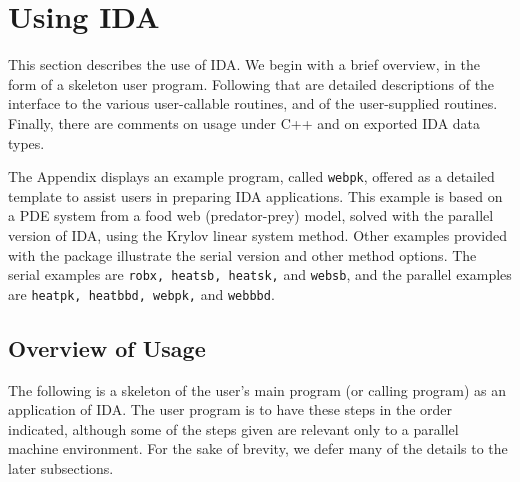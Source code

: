 \documentclass[11pt]{article}
\begin{document}
\section{Using IDA}

This section describes the use of IDA.  We begin with a brief
overview, in the form of a skeleton user program.  Following that are
detailed descriptions of the interface to the various user-callable
routines, and of the user-supplied routines.  Finally, there are
comments on usage under C++ and on exported IDA data types.

The Appendix displays an example program, called {\tt webpk}, offered
as a detailed template to assist users in preparing IDA applications.
This example is based on a PDE system from a food web (predator-prey)
model, solved with the parallel version of IDA, using the Krylov
linear system method.  Other examples provided with the package
illustrate the serial version and other method options.  The serial
examples are {\tt robx, heatsb, heatsk,} and {\tt websb}, and the
parallel examples are {\tt heatpk, heatbbd, webpk,} and {\tt webbbd}.


\subsection{Overview of Usage}

The following is a skeleton of the user's main program (or
calling program) as an application of IDA.  The user program is to
have these steps in the order indicated, although some of the steps
given are relevant only to a parallel machine environment.  For the
sake of brevity, we defer many of the details to the later
subsections.

\end{document}
